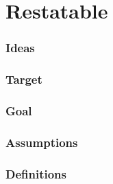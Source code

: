 \chapter{Restatable}
\label{cha:restatable}

\subsection*{Ideas}

\ideaDefeatersForCS*

\ideaEIS*

\ideaUSE*

\ideaCSbyAR*

\ideaCSbyWR*

\subsection*{Target}

\targetESU*

\targeGESU*

\subsection*{Goal}

\goalEAS*

\thoughtEASw*

\subsection*{Assumptions}

\assuCSVP*

\assuCSRR*

\assuNFCS*

\assuEIS*

\assuRClosure*

\assuCSNoExp*

\assuCSbyPCS*

\assuCSPersists*

\assuDetachToClaim*

\subsection*{Definitions}







